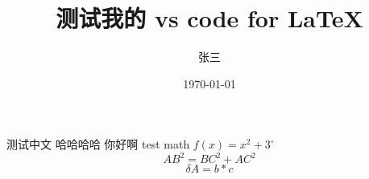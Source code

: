 \documentclass{article}%
\title{\heiti 测试我的 vs code for \LaTeX}%
\author{\kaishu 张三}%
\date{\heiti \today}%
\newcommand\degree{^\circ}%
\begin{document}
\maketitle
测试中文
哈哈哈哈
你好啊
test math $f(x)=x^2+3\degree$ %
\begin{equation}
    AB^2=BC^2+AC^2
\end{equation}%
\begin{equation}
    \delta A=b*c
\end{equation}
\end{document}
